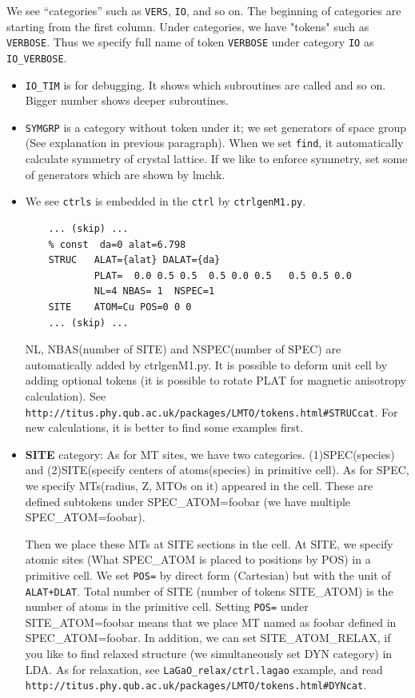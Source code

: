 \documentclass[a4paper,10pt,epsf,fleqn]{article}
\begin{document}
{%
We see ``categories'' such as \verb+VERS+, \verb+IO+, and so on.
The beginning of categories are starting from the first column.
Under categories, we have "tokens" such as \verb+VERBOSE+.
Thus we specify full name of token \verb+VERBOSE+ under category
\verb+IO+ as \verb+IO_VERBOSE+.


\begin{itemize}
\item
\verb+IO_TIM+ is for debugging. It shows which subroutines are
called and so on. Bigger number shows deeper subroutines.

\item
\verb+SYMGRP+ is a category without token under it; 
we set generators of space group (See explanation in previous paragraph).
When we set \verb+find+, it automatically calculate symmetry of crystal lattice.
If we like to enforce symmetry, set some of generators which are shown by lmchk.


\item
We see \verb+ctrls+ is embedded in the \verb+ctrl+ by \verb+ctrlgenM1.py+.
\begin{verbatim}
    ... (skip) ...
    % const  da=0 alat=6.798
    STRUC   ALAT={alat} DALAT={da}
            PLAT=  0.0 0.5 0.5  0.5 0.0 0.5   0.5 0.5 0.0
            NL=4 NBAS= 1  NSPEC=1
    SITE    ATOM=Cu POS=0 0 0
    ... (skip) ...
\end{verbatim}
NL, NBAS(number of SITE) and NSPEC(number of SPEC) are automatically
added by ctrlgenM1.py.
It is possible to deform unit cell by adding optional tokens
(it is possible to rotate PLAT for magnetic anisotropy calculation).
See \verb+http://titus.phy.qub.ac.uk/packages/LMTO/tokens.html#STRUCcat+.
For new calculations, it is better to find some examples first.

\item
{\bf SITE} category:
As for MT sites, we have two categories.
(1)SPEC(species) and (2)SITE(specify centers of atoms(species) in primitive cell).
As for SPEC, we specify MTs(radius, Z, MTOs on it) appeared in the cell.
These are defined subtokens under SPEC\_ATOM=foobar (we have multiple SPEC\_ATOM=foobar).

Then we place these MTs at SITE sections in the cell.
At SITE, we specify atomic sites 
(What SPEC\_ATOM is placed to positions by POS) in a primitive cell.
We set \verb+POS=+ by direct form (Cartesian) but with the unit of \verb$ALAT+DLAT$.
Total number of SITE (number of tokens SITE\_ATOM) is
the number of atoms in the primitive cell.
Setting \verb+POS=+ under  SITE\_ATOM=foobar 
means that we place MT named as foobar defined in SPEC\_ATOM=foobar.
In addition, we can set SITE\_ATOM\_RELAX, if you like to find relaxed
structure (we simultaneously set DYN category) in LDA. As for
relaxation, see \verb+LaGaO_relax/ctrl.lagao+
example, and read\\ \verb+http://titus.phy.qub.ac.uk/packages/LMTO/tokens.html#DYNcat+.\\


\end{itemize}}
\end{document}
